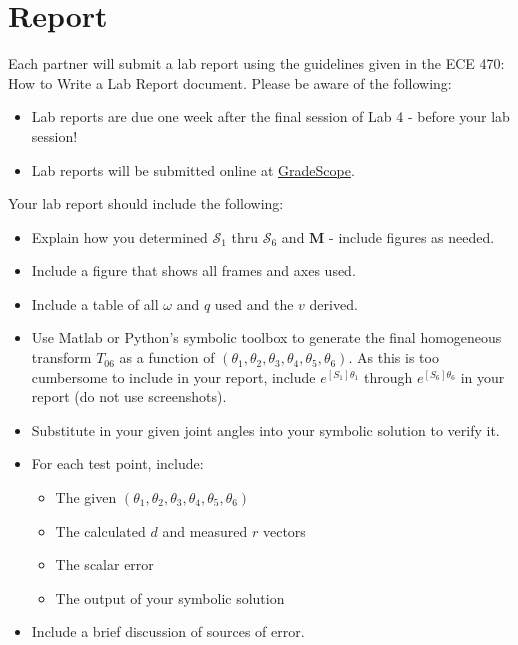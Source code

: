 \section{Report}
Each partner will submit a lab report using the guidelines given in the ECE 470: How to Write a Lab Report document.  Please be aware of the following:
\begin{itemize}
    \item Lab reports are due one week after the final session of Lab 4 - before your lab session!
    \item Lab reports will be submitted online at \href{https://www.gradescope.com}{GradeScope}.
\end{itemize}
Your lab report should include the following:
\begin{itemize}
\item Explain how you determined $\mathcal{S}_{1}$ thru $\mathcal{S}_{6}$ and $\textbf{M}$ - include figures as needed.
\item Include a figure that shows all frames and axes used.
\item Include a table of all $\omega$ and $q$ used and the $v$ derived.

 \item Use Matlab or Python's symbolic toolbox to generate the final homogeneous transform $T_{06}$ as a function of $\left(\theta_{1},\theta_{2},\theta_{3},\theta_{4},\theta_{5},\theta_{6}\right)$.  As this is too cumbersome to include in your report, include $e^{[S_1]\theta_1}$ through $e^{[S_6]\theta_6}$ in your report (do not use screenshots).\\

\item Substitute in your given joint angles into your symbolic solution to verify it.
\item For each test point, include:
    \begin{itemize}
        \item The given $\left(\theta_{1},\theta_{2},\theta_{3},\theta_{4},\theta_{5},\theta_{6}\right)$
        \item The calculated $d$ and measured $r$ vectors
        \item The scalar error
        \item The output of your symbolic solution
    \end{itemize}
    \item Include a brief discussion of sources of error.
\end{itemize}
